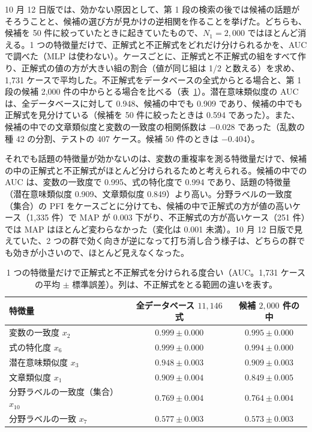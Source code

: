 \documentclass[11pt,a4paper]{ltjsarticle}
\begin{document}
10 月 12 日版では、効かない原因として、第 1 段の検索の後では候補の話題がそろうことと、候補の選び方が見かけの逆相関を作ることを挙げた。どちらも、候補を 50 件に絞っていたときに起きていたもので、$N_1 = 2{,}000$ ではほとんど消える。1 つの特徴量だけで、正解式と不正解式をどれだけ分けられるかを、AUC で調べた（MLP は使わない）。ケースごとに、正解式と不正解式の組をすべて作り、正解式の値の方が大きい組の割合（値が同じ組は 1/2 と数える）を求め、1{,}731 ケースで平均した。不正解式をデータベースの全式からとる場合と、第 1 段の候補 2{,}000 件の中からとる場合を比べる（表~\ref{tab:auc}）。潜在意味類似度の AUC は、全データベースに対して 0.948、候補の中でも 0.909 であり、候補の中でも正解式を見分けている（候補を 50 件に絞ったときは 0.594 であった）。また、候補の中での文章類似度と変数の一致度の相関係数は $-0.028$ であった（乱数の種 42 の分割、テストの 407 ケース。候補 50 件のときは $-0.404$）。

それでも話題の特徴量が効かないのは、変数の重複率を測る特徴量だけで、候補の中の正解式と不正解式がほとんど分けられるためと考えられる。候補の中での AUC は、変数の一致度で 0.995、式の特化度で 0.994 であり、話題の特徴量（潜在意味類似度 0.909、文章類似度 0.849）より高い。分野ラベルの一致度（集合）の PFI をケースごとに分けても、候補の中で正解式の方が値の高いケース（1{,}335 件）で MAP が 0.003 下がり、不正解式の方が高いケース（251 件）では MAP はほとんど変わらなかった（変化は 0.001 未満）。10 月 12 日版で見えていた、2 つの群で効く向きが逆になって打ち消し合う様子は、どちらの群でも効きが小さいので、ほとんど見えなくなった。

\begin{table}[t]\centering
\small
\caption{1 つの特徴量だけで正解式と不正解式を分けられる度合い（AUC。1{,}731 ケースの平均 $\pm$ 標準誤差）。列は、不正解式をとる範囲の違いを表す。}
\label{tab:auc}
\begin{tabular}{lcc}
\toprule
特徴量 & 全データベース $11{,}146$ 式 & 候補 $2{,}000$ 件の中 \\
\midrule
変数の一致度 $x_2$ & $0.999 \pm 0.000$ & $0.995 \pm 0.000$ \\
式の特化度 $x_6$ & $0.999 \pm 0.000$ & $0.994 \pm 0.000$ \\
潜在意味類似度 $x_3$ & $0.948 \pm 0.003$ & $0.909 \pm 0.003$ \\
文章類似度 $x_1$ & $0.909 \pm 0.004$ & $0.849 \pm 0.005$ \\
分野ラベルの一致度（集合）$x_{10}$ & $0.769 \pm 0.004$ & $0.764 \pm 0.004$ \\
分野ラベルの一致 $x_7$ & $0.577 \pm 0.003$ & $0.573 \pm 0.003$ \\
\bottomrule
\end{tabular}
\end{table}
\end{document}
